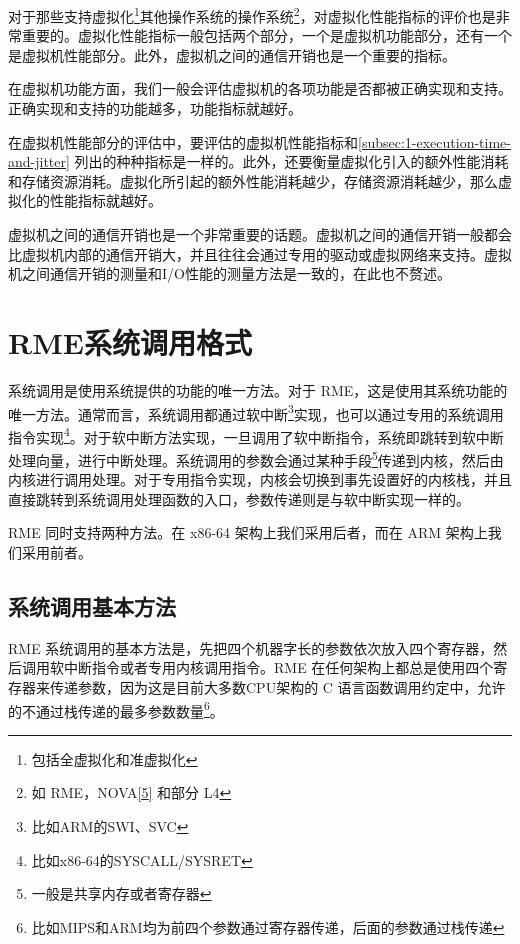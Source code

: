 对于那些支持虚拟化\footnote{包括全虚拟化和准虚拟化}其他操作系统的操作系统\footnote{如 RME，NOVA\hyperref[cite:1-5]{{[}5{]}} 和部分 L4}，对虚拟化性能指标的评价也是非常重要的。虚拟化性能指标一般包括两个部分，一个是虚拟机功能部分，还有一个是虚拟机性能部分。此外，虚拟机之间的通信开销也是一个重要的指标。

在虚拟机功能方面，我们一般会评估虚拟机的各项功能是否都被正确实现和支持。正确实现和支持的功能越多，功能指标就越好。

在虚拟机性能部分的评估中，要评估的虚拟机性能指标和\ref{subsec:1-execution-time-and-jitter}
列出的种种指标是一样的。此外，还要衡量虚拟化引入的额外性能消耗和存储资源消耗。虚拟化所引起的额外性能消耗越少，存储资源消耗越少，那么虚拟化的性能指标就越好。

虚拟机之间的通信开销也是一个非常重要的话题。虚拟机之间的通信开销一般都会比虚拟机内部的通信开销大，并且往往会通过专用的驱动或虚拟网络来支持。虚拟机之间通信开销的测量和I/O性能的测量方法是一致的，在此也不赘述。

\section{RME系统调用格式}\label{sec:1-system-call-format}

系统调用是使用系统提供的功能的唯一方法。对于 RME，这是使用其系统功能的唯一方法。通常而言，系统调用都通过软中断\footnote{比如ARM的SWI、SVC}实现，也可以通过专用的系统调用指令实现\footnote{比如x86-64的SYSCALL/SYSRET}。对于软中断方法实现，一旦调用了软中断指令，系统即跳转到软中断处理向量，进行中断处理。系统调用的参数会通过某种手段\footnote{一般是共享内存或者寄存器}传递到内核，然后由内核进行调用处理。对于专用指令实现，内核会切换到事先设置好的内核栈，并且直接跳转到系统调用处理函数的入口，参数传递则是与软中断实现一样的。

RME 同时支持两种方法。在 x86-64 架构上我们采用后者，而在 ARM 架构上我们采用前者。

\subsection{系统调用基本方法}\label{subsec:1-system-call-basics}

RME 系统调用的基本方法是，先把四个机器字长的参数依次放入四个寄存器，然后调用软中断指令或者专用内核调用指令。RME 在任何架构上都总是使用四个寄存器来传递参数，因为这是目前大多数CPU架构的 C 语言函数调用约定中，允许的不通过栈传递的最多参数数量\footnote{比如MIPS和ARM均为前四个参数通过寄存器传递，后面的参数通过栈传递}。

